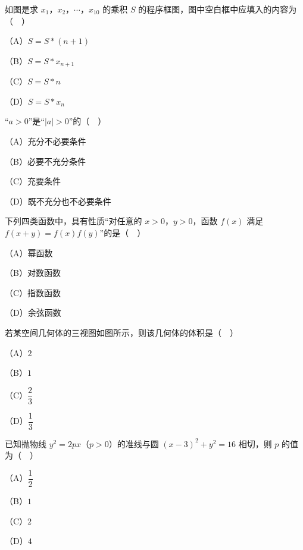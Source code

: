 \endgroup
\begingroup
\renewenvironment{question}{\Needspace{0.5\textheight}}{}
\begin{question}
如图是求 $x_1$，$x_2$，$\cdots$，$x_{10}$ 的乘积 $S$ 的程序框图，图中空白框中应填入的内容为（　）

（A）$S=S*(n+1)$

（B）$S=S*x_{n+1}$

（C）$S=S*n$

（D）$S=S*x_n$
\nopagebreak[4]
\begin{center}\end{center}
\nopagebreak[4]
\end{question}
\endgroup
\begin{question}
“$a>0$”是“$|a|>0$”的（　）

（A）充分不必要条件

（B）必要不充分条件

（C）充要条件

（D）既不充分也不必要条件

\end{question}
\begin{question}
下列四类函数中，具有性质“对任意的 $x>0$，$y>0$，函数 $f(x)$ 满足 $f(x+y)=f(x)f(y)$”的是（　）

（A）幂函数

（B）对数函数

（C）指数函数

（D）余弦函数

\Needspace{0.4\textheight}
\end{question}
\begingroup
\renewenvironment{question}{\Needspace{0.5\textheight}}{}
\begin{question}
若某空间几何体的三视图如图所示，则该几何体的体积是（　）

（A）$2$

（B）$1$

（C）$\dfrac23$

（D）$\dfrac13$
\nopagebreak[4]
\begin{center}\end{center}
\nopagebreak[4]
\end{question}
\endgroup
\begin{question}
已知抛物线 $y^2=2px$（$p>0$）的准线与圆 $(x-3)^2+y^2=16$ 相切，则 $p$ 的值为（　）

（A）$\dfrac12$

（B）$1$

（C）$2$

（D）$4$

\end{question}

